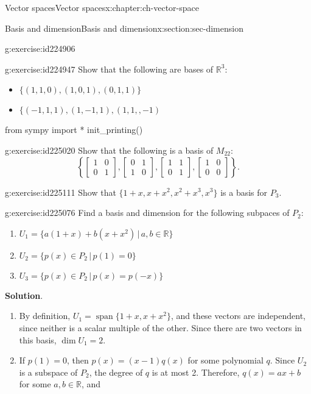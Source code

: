 \documentclass[oneside,10pt,]{book}
\numberwithin{equation}{section}
\newcommand{\spn}{\operatorname{span}}
\newcommand{\bbm}{\begin{bmatrix}}
\newcommand{\ebm}{\end{bmatrix}}
\newcommand{\R}{\mathbb{R}}
\newcommand{\amp}{&}
\begin{document}
\begin{chapterptx}{Vector spaces}{}{Vector spaces}{}{}{x:chapter:ch-vector-space}
\begin{sectionptx}{Basis and dimension}{}{Basis and dimension}{}{}{x:section:sec-dimension}
\begin{inlineexercise}{}{g:exercise:id224906}
\end{inlineexercise}
\begin{inlineexercise}{}{g:exercise:id224947}%
Show that the following are bases of \(\R^3\):%
\begin{itemize}[label=\textbullet]
\item{}\(\{(1,1,0),(1,0,1),(0,1,1)\}\)%
\item{}\(\{(-1,1,1),(1,-1,1),(1,1,,-1)\)%
\end{itemize}
%
\end{inlineexercise}
\begin{sageinput}
from sympy import *
init_printing()
\end{sageinput}
\begin{inlineexercise}{}{g:exercise:id225020}%
Show that the following is a basis of \(M_{22}\):%
\begin{equation*}
\left\{\bbm 1\amp 0\\0\amp 1\ebm, \bbm 0\amp 1\\1\amp 0\ebm, \bbm 1\amp 1\\0\amp 1\ebm, \bbm 1\amp 0\\0\amp 0\ebm\right\}\text{.}
\end{equation*}
%
\end{inlineexercise}
\begin{inlineexercise}{}{g:exercise:id225111}%
Show that \(\{1+x,x+x^2,x^2+x^3,x^3\}\) is a basis for \(P_3\).%
\end{inlineexercise}
\begin{inlineexercise}{}{g:exercise:id225076}%
Find a basis and dimension for the following subpaces of \(P_2\):%
\begin{enumerate}[label=\alph*]
\item{}\(U_1 = \{a(1+x)+b(x+x^2)\,|\, a,b\in\R\}\)%
\item{}\(U_2=\{p(x)\in P_2 \,|\, p(1)=0\}\)%
\item{}\(U_3 = \{p(x)\in P_2 \,|\, p(x)=p(-x)\}\)%
\end{enumerate}
%
\par\smallskip%
\noindent\textbf{Solution}.\hypertarget{g:solution:id225182}{}\quad{}%
\begin{enumerate}[label=\alph*]
\item{}By definition, \(U_1 = \spn \{1+x,x+x^2\}\), and these vectors are independent, since neither is a scalar multiple of the other. Since there are two vectors in this basis, \(\dim U_1 = 2\).%
\item{}If \(p(1)=0\), then \(p(x)=(x-1)q(x)\) for some polynomial \(q\). Since \(U_2\) is a subspace of \(P_2\), the degree of \(q\) is at most 2. Therefore, \(q(x)=ax+b\) for some \(a,b\in\R\), and%

\end{enumerate}
\end{inlineexercise}
\end{sectionptx}
\end{chapterptx}
\end{document}

